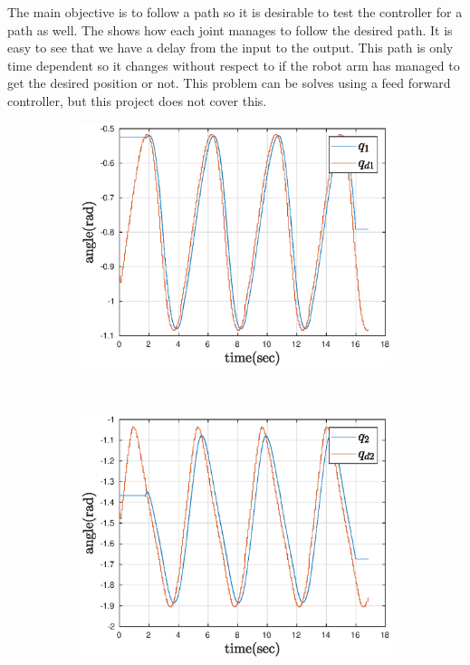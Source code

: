 The main objective is to follow a path so it is desirable to test the controller for a path as well. The  shows how each joint manages to follow the desired path. It is easy to see that we have a delay from the input to the output. This path is only time dependent so it changes without respect to if the robot arm has managed to get the desired position or not. This problem can be solves using a feed forward controller, but this project does not cover this.

\def\picsSiz{1.08}
\begin{figure}[htbp]
    \centering
    \begin{subfigure}[htbp]{0.45\textwidth}
        \centering
        \includegraphics[width = \picsSiz\linewidth]{img/pathF1.eps}
        \caption{ }
        \label{}
    \end{subfigure}
    ~ 
    \begin{subfigure}[htbp]{0.45\textwidth}
        \centering
        \includegraphics[width = \picsSiz\linewidth]{img/pathF2.eps}

\end{subfigure}
\end{figure}
